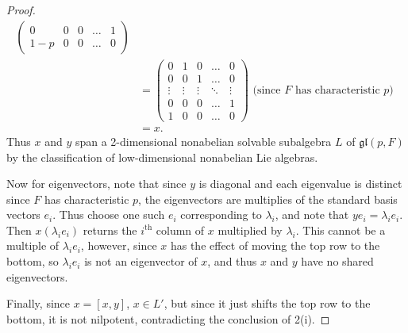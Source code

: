 \documentclass[12pt]{article}
\newcommand{\gl}{\mathfrak{gl}}
\theoremstyle{definition}
\begin{document}
\begin{proof}
\begin{align*}
\begin{pmatrix}
		                          0      & 0      & 0      & \dots  & 1      \\
		                          1 - p  & 0      & 0      & \dots  & 0
	                          \end{pmatrix}                                            \\
                      & = \begin{pmatrix}
		                          0      & 1      & 0      & \dots  & 0      \\
		                          0      & 0      & 1      & \dots  & 0      \\
		                          \vdots & \vdots & \vdots & \ddots & \vdots \\
		                          0      & 0      & 0      & \dots  & 1      \\
		                          1      & 0      & 0      & \dots  & 0
                      \end{pmatrix} \text{ (since $F$ has characteristic $p$) }                                            \\
                      & = x.
	\end{align*}
  Thus $x$ and $y$ span a 2-dimensional nonabelian solvable subalgebra $L$ of $\gl(p, F)$ by the classification of low-dimensional nonabelian Lie algebras.
  
  Now for eigenvectors, note that since $y$ is diagonal and each eigenvalue is distinct since $F$ has characteristic $p$, the eigenvectors are multiplies of the standard basis vectors $e_i$.
  Thus choose one such $e_i$ corresponding to $\lambda_i$, and note that $ye_i = \lambda_i e_i$.
  Then $x(\lambda_ie_i)$ returns the $i^{\text{th}}$ column of $x$ multiplied by $\lambda_i$.
  This cannot be a multiple of $\lambda_ie_i$, however, since $x$ has the effect of moving the top row to the bottom, so $\lambda_ie_i$ is not an eigenvector of $x$, and thus $x$ and $y$ have no shared eigenvectors.

  Finally, since $x = [x, y]$, $x \in L'$, but since it just shifts the top row to the bottom, it is not nilpotent, contradicting the conclusion of 2(i).
\end{proof}
\end{document}
